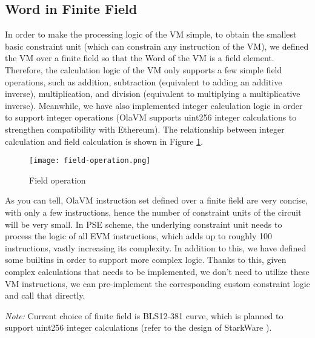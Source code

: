 \subsection{Word in Finite Field}

In order to make the processing logic of the VM simple, to obtain the smallest basic constraint unit (which can constrain any instruction of the VM), we defined the VM over a finite field so that the Word of the VM is a field element. Therefore, the calculation logic of the VM only supports a few simple field operations, such as addition, subtraction (equivalent to adding an additive inverse), multiplication, and division (equivalent to multiplying a multiplicative inverse). Meanwhile, we have also implemented integer calculation logic in order to support integer operations (OlaVM supports uint256 integer calculations to strengthen compatibility with Ethereum). The relationship between integer calculation and field calculation is shown in Figure \ref{fig:field-operation}.
\begin{figure}[!ht]
    \centering
    \texttt{[image: field-operation.png]}
    \caption{Field operation}
    \label{fig:field-operation}
\end{figure}

As you can tell, OlaVM instruction set defined over a finite field are very concise, with only a few instructions, hence the number of constraint units of the circuit will be very small. In PSE scheme, the underlying constraint unit needs to process the logic of all EVM instructions, which adds up to roughly 100 instructions, vastly increasing its complexity. In addition to this, we have defined some builtins in order to support more complex logic. Thanks to this, given complex calculations that needs to be implemented, we don't need to utilize these VM instructions, we can pre-implement the corresponding custom constraint logic and call that directly.

\emph{Note:} Current choice of finite field is BLS12-381 curve, which is planned to support uint256 integer calculations (refer to the design of StarkWare \cite{website:starkware}).
